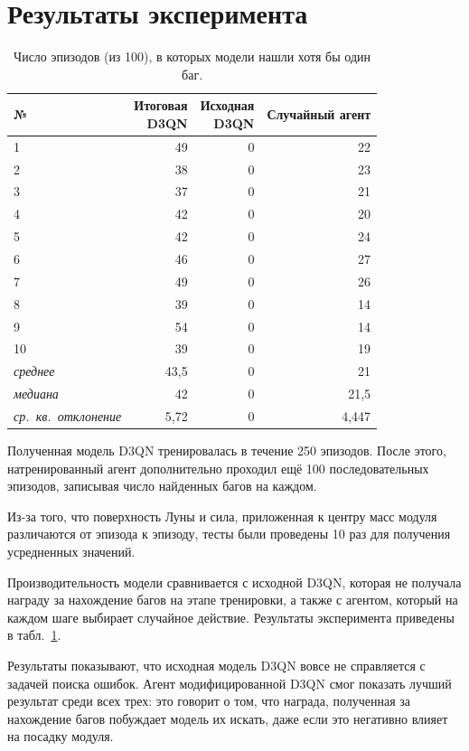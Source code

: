 \section{Результаты эксперимента}

\begin{table}[ht]
	\centering
	\caption{Число эпизодов (из 100), в которых модели нашли хотя бы один баг.}
	\begin{tabular}{ l r r r }
		\hline
		№ & \makecell[r]{Итоговая\\D3QN} & \makecell[r]{Исходная\\D3QN} & Случайный агент \\
		\hline
		1 & 49 & 0 & 22\\
		2 & 38 & 0 & 23\\
		3 & 37 & 0 & 21\\
		4 & 42 & 0 & 20\\
		5 & 42 & 0 & 24\\
		6 & 46 & 0 & 27\\
		7 & 49 & 0 & 26\\
		8 & 39 & 0 & 14\\
		9 & 54 & 0 & 14\\
		10 & 39 & 0 & 19\\
		\hline
		\textit{среднее} & 43,5 & 0 & 21 \\
		\textit{медиана} & 42 & 0 & 21,5 \\
		\textit{ср.~кв.~отклонение} & 5,72 & 0 & 4,447 \\
		\hline
	\end{tabular}
	\label{tab:results}
\end{table}

Полученная модель D3QN тренировалась в течение 250 эпизодов. После этого, натренированный агент дополнительно проходил ещё 100 последовательных эпизодов, записывая число найденных багов на каждом. 

Из-за того, что поверхность Луны и сила, приложенная к центру масс модуля различаются от эпизода к эпизоду, тесты были проведены 10 раз для получения усредненных значений.

Производительность модели сравнивается с исходной D3QN, которая не получала награду за нахождение багов на этапе тренировки, а также с агентом, который на каждом шаге выбирает случайное действие. Результаты эксперимента приведены в табл.~\ref{tab:results}. 

Результаты показывают, что исходная модель D3QN вовсе не справляется с задачей поиска ошибок. Агент модифицированной D3QN смог показать лучший результат среди всех трех: это говорит о том, что награда, полученная за нахождение багов побуждает модель их искать, даже если это негативно влияет на посадку модуля.

